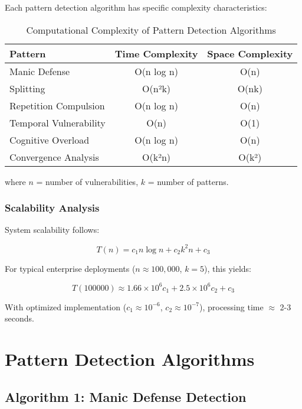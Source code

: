 \documentclass[11pt,a4paper]{article}
\begin{document}
Each pattern detection algorithm has specific complexity characteristics:

\begin{table}[h!]
\centering
\caption{Computational Complexity of Pattern Detection Algorithms}
\label{tab:complexity}
\begin{tabular}{lcc}
\toprule
Pattern & Time Complexity & Space Complexity \\
\midrule
Manic Defense & O(n log n) & O(n) \\
Splitting & O(n²k) & O(nk) \\
Repetition Compulsion & O(n log n) & O(n) \\
Temporal Vulnerability & O(n) & O(1) \\
Cognitive Overload & O(n log n) & O(n) \\
Convergence Analysis & O(k²n) & O(k²) \\
\bottomrule
\end{tabular}
\end{table}

where $n$ = number of vulnerabilities, $k$ = number of patterns.

\subsubsection{Scalability Analysis}

System scalability follows:

\begin{equation}
T(n) = c_1 n \log n + c_2 k^2 n + c_3
\end{equation}

For typical enterprise deployments ($n \approx 100,000$, $k = 5$), this yields:

\begin{equation}
T(100000) \approx 1.66 \times 10^6 c_1 + 2.5 \times 10^6 c_2 + c_3
\end{equation}

With optimized implementation ($c_1 \approx 10^{-6}$, $c_2 \approx 10^{-7}$), processing time $\approx$ 2-3 seconds.

\section{Pattern Detection Algorithms}

\subsection{Algorithm 1: Manic Defense Detection}
\end{document}

